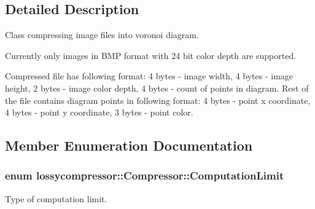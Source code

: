 \subsection{Detailed Description}
Class compressing image files into voronoi diagram. 

Currently only images in B\+MP format with 24 bit color depth are supported.

Compressed file has following format\+: 4 bytes -\/ image width, 4 bytes -\/ image height, 2 bytes -\/ image color depth, 4 bytes -\/ count of points in diagram. Rest of the file contains diagram points in following format\+: 4 bytes -\/ point x coordinate, 4 bytes -\/ point y coordinate, 3 bytes -\/ point color. 

\subsection{Member Enumeration Documentation}
\subsubsection[{\texorpdfstring{Computation\+Limit}{ComputationLimit}}]{\setlength{\rightskip}{0pt plus 5cm}enum {\bf lossycompressor\+::\+Compressor\+::\+Computation\+Limit}}\hypertarget{classlossycompressor_1_1_compressor_aae4947e887bbd9773bd2ceb47363d4f1}{}\label{classlossycompressor_1_1_compressor_aae4947e887bbd9773bd2ceb47363d4f1}


Type of computation limit. 

